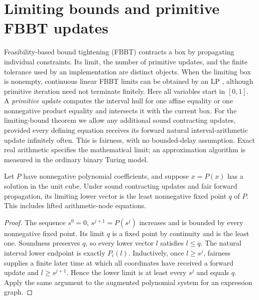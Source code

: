 \section{Limiting bounds and primitive FBBT updates}\label{app:fbbt}
Feasibility-based bound tightening (FBBT) contracts a box by propagating
individual constraints. Its limit, the number of primitive updates, and
the finite tolerance used by an implementation are distinct objects.
When the limiting box is nonempty, continuous linear FBBT limits can be
obtained by an LP \citep[Theorem~4.1]{BelottiEtAl2012}, although primitive
iteration need not terminate finitely.
Here all variables start in $[0,1]$. A \emph{primitive update} computes the
interval hull for one affine equality or one nonnegative product equality
and intersects it with the current box. For the limiting-bound theorem
we allow any additional sound contracting updates, provided every defining equation
receives its forward natural interval-arithmetic update infinitely often.
This is fairness, with no bounded-delay assumption. Exact real arithmetic
specifies the mathematical limit; an approximation algorithm is measured
in the ordinary binary Turing model.

\begin{lemma}\label{lem:fbbt-fixed-point}
Let $P$ have nonnegative polynomial coefficients, and suppose $x=P(x)$
has a solution in the unit cube. Under sound contracting updates and fair forward
propagation, its limiting lower vector is the least nonnegative fixed
point $q$ of $P$. This includes lifted arithmetic-node equations.
\end{lemma}
\begin{proof}
The sequence $s^0=0$, $s^{j+1}=P(s^j)$ increases and is bounded by every
nonnegative fixed point. Its limit $q$ is a fixed point by continuity and
is the least one. Soundness preserves $q$, so every lower vector $l$
satisfies $l\le q$. The natural interval lower endpoint is exactly $P_i(l)$.
Inductively, once $l\ge s^j$, fairness supplies a finite later time at
which all coordinates have received a forward update and $l\ge s^{j+1}$.
Hence the lower limit is at least every $s^j$ and equals $q$. Apply the
same argument to the augmented polynomial system for an expression graph.
\end{proof}

